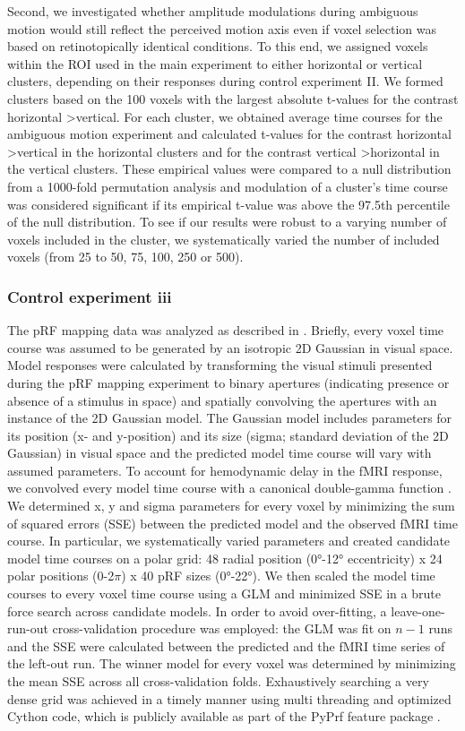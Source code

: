Second, we investigated whether amplitude modulations during ambiguous motion would still reflect the perceived motion axis even if voxel selection was based on retinotopically identical conditions. To this end, we assigned voxels within the ROI used in the main experiment to either horizontal or vertical clusters, depending on their responses during control experiment II. We formed clusters based on the 100 voxels with the largest absolute t-values for the contrast horizontal \textgreater vertical. For each cluster, we obtained average time courses for the ambiguous motion experiment and calculated t-values for the contrast horizontal \textgreater vertical in the horizontal clusters and for the contrast vertical \textgreater horizontal in the vertical clusters. These empirical values were compared to a null distribution from a 1000-fold permutation analysis and modulation of a cluster's time course was considered significant if its empirical t-value was above the 97.5th percentile of the null distribution. To see if our results were robust to a varying number of voxels included in the cluster, we systematically varied the number of included voxels (from 25 to 50, 75, 100, 250 or 500).

\subsubsection{Control experiment iii}
The pRF mapping data was analyzed as described in \cite{Dumoulin2008}. Briefly, every voxel time course was assumed to be generated by an isotropic 2D Gaussian in visual space. Model responses were calculated by transforming the visual stimuli presented during the pRF mapping experiment to binary apertures (indicating presence or absence of a stimulus in space) and spatially convolving the apertures with an instance of the 2D Gaussian model. The Gaussian model includes parameters for its position (x- and y-position) and its size (sigma; standard deviation of the 2D Gaussian) in visual space and the predicted model time course will vary with assumed parameters. To account for hemodynamic delay in the fMRI response, we convolved every model time course with a canonical double-gamma function \parencite{Friston1998}. We determined x, y and sigma parameters for every voxel by minimizing the sum of squared errors (SSE) between the predicted model and the observed fMRI time course. In particular, we systematically varied parameters and created candidate model time courses on a polar grid: 48 radial position (0°-12° eccentricity) x 24 polar positions (0-2$\pi$) x 40 pRF sizes (0°-22°). We then scaled the model time courses to every voxel time course using a GLM and minimized SSE in a brute force search across candidate models. In order to avoid over-fitting, a leave-one-run-out cross-validation procedure was employed: the GLM was fit on $n-1$ runs and the SSE were calculated between the predicted and the fMRI time series of the left-out run. The winner model for every voxel was determined by minimizing the mean SSE across all cross-validation folds. Exhaustively searching a very dense grid was achieved in a timely manner using multi threading and optimized Cython code, which is publicly available as part of the PyPrf feature package \parencite{pyprf_feature}.

